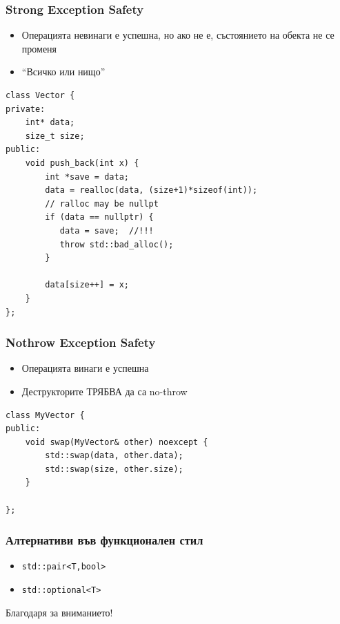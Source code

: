 \documentclass{beamer}
\begin{document}
\begin{frame}[fragile]
\frametitle{Strong Exception Safety}

\begin{itemize}
  \item Операцията невинаги е успешна, но ако не е, състоянието на обекта не се променя
  \item ``Всичко или нищо''
\end{itemize}

\begin{flushleft}
\begin{lstlisting}
class Vector {
private:
    int* data;
    size_t size;
public:
    void push_back(int x) {
        int *save = data;
        data = realloc(data, (size+1)*sizeof(int));
        // ralloc may be nullpt
        if (data == nullptr) {
           data = save;  //!!!
           throw std::bad_alloc();
        }

        data[size++] = x;
    }
};
\end{lstlisting}
\end{flushleft}

\end{frame}


\begin{frame}[fragile]
\frametitle{Nothrow Exception Safety}

\begin{itemize}
  \item Операцията винаги е успешна
  \item Деструкторите ТРЯБВА да са no-throw
\end{itemize}

\begin{flushleft}
\begin{lstlisting}
class MyVector {
public:
    void swap(MyVector& other) noexcept {
        std::swap(data, other.data);
        std::swap(size, other.size);
    }

};
\end{lstlisting}
\end{flushleft}

\end{frame}



\begin{frame}[fragile]
  \frametitle{Алтернативи във функционален стил}

  \begin{itemize}
    \item \verb#std::pair<T,bool>#
    \item \verb#std::optional<T>#
  \end{itemize}
\end{frame}

\begin{frame}
\centerline{Благодаря за вниманието!}
\end{frame}
\end{document}
